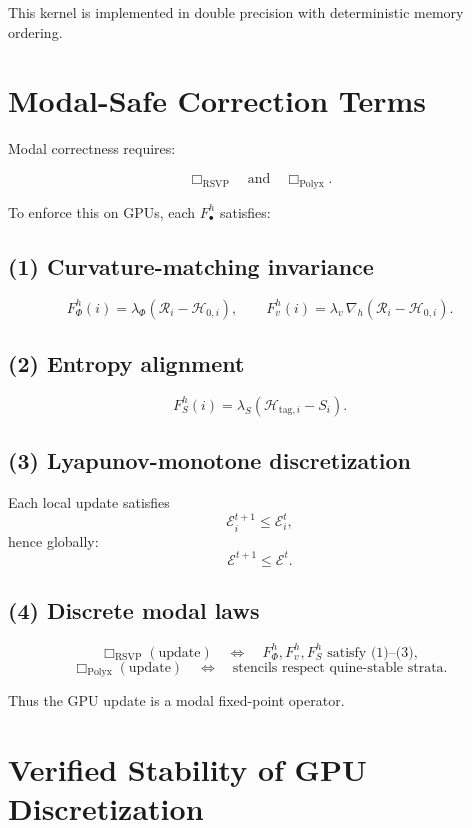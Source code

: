 This kernel is implemented in double precision with deterministic memory ordering.

\section{Modal-Safe Correction Terms}
\label{ch:44-modal}

Modal correctness requires:

\[
\Box_{\mathrm{RSVP}} \quad\text{and}\quad \Box_{\mathrm{Polyx}}.
\]

To enforce this on GPUs, each $F_\bullet^h$ satisfies:

\subsection*{(1) Curvature-matching invariance}

\[
F_\Phi^h(i)
=
\lambda_\Phi\left(\mathcal{R}_i - \mathcal{H}_{0,i}\right),
\qquad
F_v^h(i)
=
\lambda_v\,\nabla_h\left(\mathcal{R}_i - \mathcal{H}_{0,i}\right).
\]

\subsection*{(2) Entropy alignment}

\[
F_S^h(i)
=
\lambda_S\left(\mathcal{H}_{\mathrm{tag},i} - S_i\right).
\]

\subsection*{(3) Lyapunov-monotone discretization}

Each local update satisfies
\[
\mathcal{E}_i^{t+1} \le \mathcal{E}_i^{t},
\]
hence globally:
\[
\mathcal{E}^{t+1} \le \mathcal{E}^{t}.
\]

\subsection*{(4) Discrete modal laws}

\[
\Box_{\mathrm{RSVP}}(\text{update})
\quad \Longleftrightarrow \quad
F_\Phi^h, F_v^h, F_S^h \text{ satisfy (1)--(3)},
\]
\[
\Box_{\mathrm{Polyx}}(\text{update})
\quad \Longleftrightarrow \quad
\text{stencils respect quine-stable strata}.
\]

Thus the GPU update is a modal fixed-point operator.

\section{Verified Stability of GPU Discretization}

